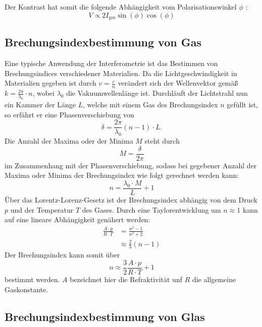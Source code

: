 \noindent Der Kontrast hat somit die folgende Abhängigkeit vom Polarisationswinkel $\phi$ :
\begin{equation}
    V \propto 2 I_{\text{ges}} \sin(\phi)\cos(\phi) \label{eqn:kontrastphi}
\end{equation}


\subsection{Brechungsindexbestimmung von Gas}

\noindent Eine typische Anwendung der Interferometrie ist das Bestimmen von Brechungsindices verschiedener Materialien. Da die Lichtgeschwindigkeit in Materialien gegeben ist durch
$ v = \frac{c}{n}$ verändert sich der Wellenvektor gemäß $ k = \frac{2 \pi}{\lambda_0} \cdot n$, wobei $\lambda_0$ die Vakuumwellenlänge ist. 
Durchläuft der Lichtstrahl nun ein Kammer der Länge $L$, welche mit einem Gas des Brechungsindex $n$ gefüllt ist, so erfährt er eine Phasenverschiebung von 
\begin{equation*}
    \delta = \frac{2 \pi}{\lambda_0} \left(n-1\right) \cdot L.
\end{equation*}
Die Anzahl der Maxima oder der Minima $M$ steht durch 
\begin{equation*}
    M = \frac{\delta}{2 \pi}
\end{equation*}
im Zusammenhang mit der Phasenverschiebung, sodass bei gegebener Anzahl der Maxima oder Minima der Brechungsindex wie folgt gerechnet werden kann:
\begin{equation}
    n = \frac{\lambda_0\cdot M}{L} + 1
\end{equation}
\noindent Über das Lorentz-Lorenz-Gesetz ist der Brechungsindex abhängig von dem Druck $p$ und der Temperatur $T$ des Gases. Durch eine Taylorentwicklung um $n \approx 1$ kann auf eine 
lineare Abhängigkeit genähert werden:
\begin{align*}
    \frac{A \cdot p}{R \cdot T} &= \frac{n^2 - 1}{n^2 + 2} \\
    &\approx \frac{2}{3}\left( n - 1 \right) 
\end{align*}
Der Brechungsindex kann somit über 
\begin{equation}
    n \approx \frac{3}{2} \frac{A \cdot p}{R \cdot T} + 1
\end{equation}
bestimmt werden. $A$ bezeichnet hier die Refraktivität unf $R$ die allgemeine Gaskonstante.


\subsection{Brechungsindexbestimmung von Glas}

